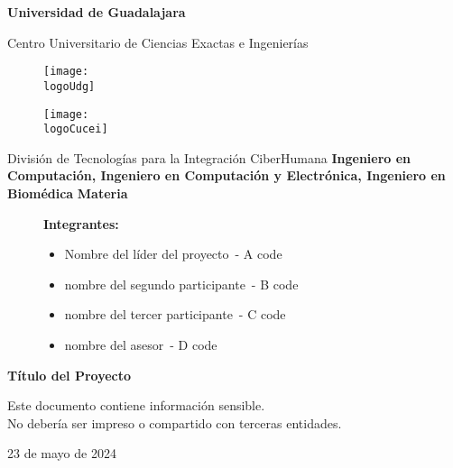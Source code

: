 \documentclass[10pt,twocolumn,letterpaper]{article}
\date{}
\title{
	\vspace*{-1cm}	\fontsize{24}{28.8}\selectfont \theTitle
}
\author{\theAuthor}
\author{\bAuthor}
\affil{\small
	\textit{CENTRO UNIVERSITARIO DE CIENCIAS}\\
	\textit{EXACTAS E INGENIERÍAS, (CUCEI, UDG)}
}
\affil{
	\fontfamily{pcr}\selectfont
	\theAuthorMail\\
	\fontfamily{pcr}\selectfont
	\bAuthorMail\\
	\fontfamily{pcr}\selectfont
	\cAuthorMail\\
	\fontfamily{pcr}\selectfont
	\dAuthorMail
	\vspace*{-18pt}
}
\newcommand{\logoUdg}{logo-udg.jpg}
\newcommand{\logoCucei}{logo-cucei.jpg}
\newcommand{\universidad}{Universidad de Guadalajara}
\newcommand{\cede}{Centro Universitario de Ciencias Exactas e Ingenierías}
\newcommand{\materia}{Materia}
\newcommand{\division}{División de Tecnologías para la Integración CiberHumana}
\newcommand{\theTitle}{Título del Proyecto}
\newcommand{\startDate}{23 de mayo de 2024}
\newcommand{\theAuthor}{Nombre del líder del proyecto}
\newcommand{\bAuthor}{nombre del segundo participante}
\newcommand{\cAuthor}{nombre del tercer participante}
\newcommand{\dAuthor}{nombre del asesor}
\newcommand{\theAuthorCode}{A code}
\newcommand{\bAuthorCode}{B code}
\newcommand{\cAuthorCode}{C code}
\newcommand{\dAuthorCode}{D code}
\newcommand{\aTitutlo}{Ingeniero en Computación}
\newcommand{\btitulo}{Ingeniero en Computación y Electrónica}
\newcommand{\cTitulo}{Ingeniero en Biomédica}
\begin{document}
\begin{titlepage}
	\onecolumn %
	\centering
	{\huge\textbf{\universidad}}\par\vspace{0.6cm}
	{\LARGE{\cede}}\vfill
	
	\begin{figure}[h]
		\begin{minipage}[t]{0.45\textwidth}
			\centering
			\texttt{[image: \\logoUdg]}
		\end{minipage}
		\hfill
		\begin{minipage}[t]{0.45\textwidth}
			\centering
			\texttt{[image: \\logoCucei]}
		\end{minipage}
	\end{figure}\vfill
	
	\Large{
		\division\vfill
		\textbf{\aTitutlo, \btitulo, \cTitulo}\vfill
		\textbf{\materia}\vfill
	}

	\begin{figure}[h]
		\centering
		\begin{minipage}[t]{0.75\textwidth}
			{\Large
				\textbf{Integrantes:}\par\vspace{8pt}
				\begin{itemize}
					\item \theAuthor\ - \theAuthorCode
					\item \bAuthor\ - \bAuthorCode
					\item \cAuthor\ - \cAuthorCode
					\item \dAuthor\ - \dAuthorCode
				\end{itemize}
			}
		\end{minipage}
	\end{figure}\vfill

	{\LARGE{\textbf{\theTitle}}}\vfill
	
	\begin{tcolorbox}[colback=red!5!white, colframe=red!75!black]
		\centering
		Este documento contiene información sensible.\\
		No debería ser impreso o compartido con terceras entidades.
	\end{tcolorbox}\vfill

	{\large \startDate}\par
\end{titlepage}
\end{document}
